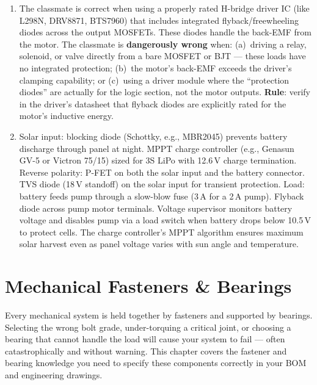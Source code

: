 \documentclass[11pt,letterpaper,twoside,openany]{book}
\begin{document}
\begin{enumerate}[leftmargin=1.5em]
  \item The classmate is correct when using a properly rated H-bridge driver IC (like L298N, DRV8871, BTS7960) that includes integrated flyback/freewheeling diodes across the output MOSFETs. These diodes handle the back-EMF from the motor. The classmate is \textbf{dangerously wrong} when: (a)~driving a relay, solenoid, or valve directly from a bare MOSFET or BJT --- these loads have no integrated protection; (b)~the motor's back-EMF exceeds the driver's clamping capability; or (c)~using a driver module where the ``protection diodes'' are actually for the logic section, not the motor outputs. \textbf{Rule}: verify in the driver's datasheet that flyback diodes are explicitly rated for the motor's inductive energy.

  \item Solar input: blocking diode (Schottky, e.g., MBR2045) prevents battery discharge through panel at night. MPPT charge controller (e.g., Genasun GV-5 or Victron 75/15) sized for 3S LiPo with 12.6\,V charge termination. Reverse polarity: P-FET on both the solar input and the battery connector. TVS diode (18\,V standoff) on the solar input for transient protection. Load: battery feeds pump through a slow-blow fuse (3\,A for a 2\,A pump). Flyback diode across pump motor terminals. Voltage supervisor monitors battery voltage and disables pump via a load switch when battery drops below 10.5\,V to protect cells. The charge controller's MPPT algorithm ensures maximum solar harvest even as panel voltage varies with sun angle and temperature.
\end{enumerate}




\FloatBarrier
\chapter{Mechanical Fasteners \& Bearings}

\vspace{1em}

\begin{keyconceptbox}
Every mechanical system is held together by fasteners and supported by bearings. Selecting the wrong bolt grade, under-torquing a critical joint, or choosing a bearing that cannot handle the load will cause your system to fail --- often catastrophically and without warning. This chapter covers the fastener and bearing knowledge you need to specify these components correctly in your BOM and engineering drawings.
\end{keyconceptbox}
\end{document}
